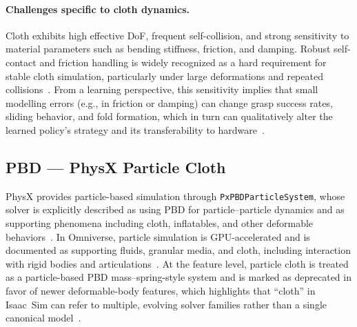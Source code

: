 \paragraph{Challenges specific to cloth dynamics.}
Cloth exhibits high effective \ac{DoF}, frequent self-collision, and strong sensitivity to
material parameters such as bending stiffness, friction, and damping. Robust self-contact
and friction handling is widely recognized as a hard requirement for stable cloth simulation,
particularly under large deformations and repeated collisions~\cite{Bridson2002ClothCollisions,Longhini2025ReviewClothManipulation}.
From a learning perspective, this sensitivity implies that small modelling errors (e.g., in
friction or damping) can change grasp success rates, sliding behavior, and fold formation,
which in turn can qualitatively alter the learned policy's strategy and its transferability to
hardware~\cite{Salvato2021RealityGapSurvey,Longhini2025ReviewClothManipulation}.

\subsection{\acs{PBD} --- PhysX Particle Cloth}

PhysX provides particle-based simulation through \texttt{PxPBDParticleSystem}, whose solver
is explicitly described as using \ac{PBD} for particle--particle dynamics and as supporting
phenomena including cloth, inflatables, and other deformable behaviors~\cite{physx_particle_system_513,physx_pbd_particlesystem_api}.
In Omniverse, particle simulation is \ac{GPU}-accelerated and is documented as supporting
fluids, granular media, and cloth, including interaction with rigid bodies and
articulations~\cite{omni_physics_particles}.
At the feature level, particle cloth is treated as a particle-based \ac{PBD} mass--spring-style
system and is marked as deprecated in favor of newer deformable-body features, which
highlights that ``cloth'' in Isaac~Sim can refer to multiple, evolving solver families rather
than a single canonical model~\cite{omni_physics_particles,isaac_sim_physics_resources_510}.

